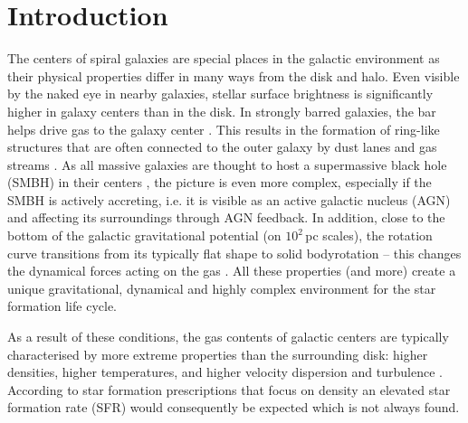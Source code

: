 
\section{Introduction} \label{dendro: section: introduction}

The centers of spiral galaxies are special places in the galactic environment as their physical properties differ in many ways from the disk and halo. Even visible by the naked eye in nearby galaxies, stellar surface brightness is significantly higher in galaxy centers than in the disk. 
In strongly barred galaxies, the bar helps drive gas to the galaxy center \citep[e.g.][]{2019A&A...623A..79C}. This results in the formation of ring-like structures that are often connected to the outer galaxy by dust lanes and gas streams \citep[e.g.][]{2001AJ....121..225B,2017MNRAS.471.4027B,2017MNRAS.470.3819B,2005A&A...429..141K,2013A&A...555L...4C,2011A&A...529A..45V}. 
As all massive galaxies are thought to host a supermassive black hole (SMBH) in their centers \citep{2013ARA&A..51..511K}, the picture is even more complex, especially if the SMBH is actively accreting, i.e. it is visible as an active galactic nucleus (AGN) and affecting its surroundings through AGN feedback. 
In addition, close to the bottom of the galactic gravitational potential (on $10^2$\,pc scales), the rotation curve transitions from its typically flat shape to solid body\linebreak[4] rotation -- this changes the dynamical forces acting on the gas \citep[e.g.][]{2017MNRAS.466.1213K}. All these properties (and more) create a unique gravitational, dynamical and highly complex environment for the star formation life cycle.

As a result of these conditions, the gas contents of galactic centers are typically characterised by more extreme properties than the surrounding disk: higher densities, higher temperatures, and higher velocity dispersion and turbulence \citep[e.g.][]{Morris:1996db,2000ApJ...536..357M,2001ApJ...562..348O,2012MNRAS.425..720S,2013PASJ...65..118S,2016A&A...586A..50G,2017ApJ...850...77K,2019MNRAS.483.4291C,2019ApJ...871..170M}. According to star formation prescriptions that focus on density \citep{2013MNRAS.429..987L,Kennicutt:1998id,2005ApJ...630..250K,Krumholz:2012ja,Lada:2012it,2010ApJ...724..687L} an elevated star formation rate (SFR) would consequently be expected which is not always found.

